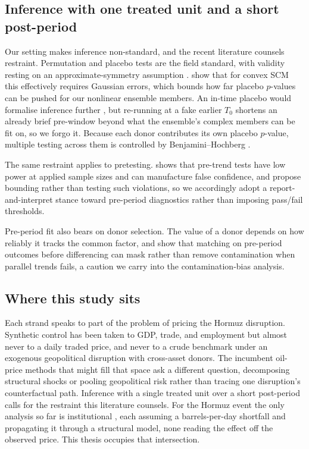 \subsection{Inference with one treated unit and a short post-period}
Our setting makes inference non-standard, and the recent literature counsels restraint.
Permutation and placebo tests \citep{abadie2010,abadie2015} are the field standard, with
validity resting on an approximate-symmetry assumption \citep{canay2017}. \citet{hahnshi2017}
show that for convex SCM this effectively requires Gaussian errors, which bounds how far
placebo $p$-values can be pushed for our nonlinear ensemble members. An in-time placebo would
formalise inference further \citep{chenyan2023}, but re-running at a fake earlier $T_0$ shortens
an already brief pre-window beyond what the ensemble's complex members can be fit on, so we
forgo it. Because each donor contributes its own placebo $p$-value, multiple testing across
them is controlled by Benjamini--Hochberg \citep{benjaminihochberg1995}.

The same restraint applies to pretesting. \citet{roth2022} shows that pre-trend tests have
low power at applied sample sizes and can manufacture false confidence, and
\citet{rambachanroth2023} propose bounding rather than testing such violations, so we
accordingly adopt a report-and-interpret stance toward pre-period diagnostics rather than
imposing pass/fail thresholds.

Pre-period fit also bears on donor selection. The value of a donor depends on how reliably
it tracks the common factor, and \citet{hammiratrix2024} show that matching on pre-period
outcomes before differencing can mask rather than remove contamination when parallel trends
fails, a caution we carry into the contamination-bias analysis.

\subsection{Where this study sits}
Each strand speaks to part of the problem of pricing the Hormuz disruption. Synthetic
control has been taken to GDP, trade, and employment but
almost never to a daily traded price, and never to a crude benchmark under an exogenous
geopolitical disruption with cross-asset donors. The incumbent oil-price methods that might fill that space ask a
different question, decomposing structural shocks or pooling geopolitical risk
rather than tracing one disruption's counterfactual path. Inference with a single treated
unit over a short post-period calls for the restraint this literature counsels. For the
Hormuz event the only analysis so far is institutional
\citep{kiel2026,oies2026,worldbank2026,iea2026,dallasfed2026}, each assuming a barrels-per-day
shortfall and propagating it through a structural model, none reading the effect off the
observed price. This thesis occupies that intersection.

